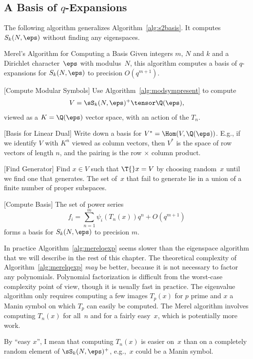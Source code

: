 \subsection{A Basis of $q$-Expansions}
The following algorithm generalizes Algorithm~\ref{alg:s2basis}.
It computes $S_k(N,\eps)$ without finding any eigenspaces.
\begin{algorithm}{Merel's Algorithm for Computing a Basis}\label{alg:merelqexp}
Given integers $m$, $N$ and $k$ and a Dirichlet character~$\eps$ with
modulus~$N$, this algorithm computes a basis of $q$-expansions
for $S_k(N,\eps)$ to precision $O(q^{m+1})$.
\begin{steps}
\item{}[Compute Modular Symbols] 
Use  Algorithm~\ref{alg:modsympresent} to
compute $$V = \sS_k(N,\eps)^+\tensor \Q(\eps),$$
viewed as a $K=\Q(\eps)$ vector space,
with an action of the $T_n$.

\item{}[Basis for Linear Dual]
Write down a basis for $V^* = \Hom(V,\Q(\eps))$.  E.g., if we identify
$V$ with $K^n$ viewed as column vectors, then $V^*$ is the space
of row vectors of length $n$, and the pairing is the row $\times$ column product.

\item{}[Find Generator]
Find $x\in V$ such that
$\T{} x = V$ by choosing random~$x$ until we find
one that generates.  The set of~$x$ that fail
to generate lie in a union of a finite number of
proper subspaces. 
\item{}[Compute Basis]  
The set of power series
$$
  f_i = \sum_{n=1}^{m} \psi_i(T_n(x)) q^n + O(q^{m+1})
$$
forms a basis for $S_k(N,\eps)$ to precision $m$.
\end{steps}
\end{algorithm}

In practice Algorithm~\ref{alg:merelqexp} seems slower than the
eigenspace algorithm that we will describe in the rest of this
chapter.  The theoretical complexity of Algorithm~\ref{alg:merelqexp}
{\em may} be better, because it is not necessary to factor any
polynomials. Polynomial factorization is difficult from the worst-case
complexity point of view, though it is usually fast in practice.  The
eigenvalue algorithm only requires computing a few images $T_p(x)$ for
$p$ prime and $x$ a Manin symbol on which $T_p$ can easily be
computed.  The Merel algorithm involves computing $T_n(x)$ for
all~$n$ and for a fairly easy~$x$, which is potentially more work.

\begin{remark}
By ``easy $x$'', I mean that computing $T_n(x)$ is easier on~$x$
than on a completely random element of $\sS_k(N,\eps)^+$,
e.g.,~$x$ could be a Manin symbol.
\end{remark}


